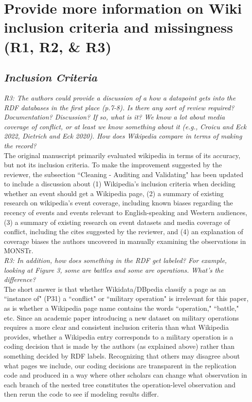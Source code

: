 \documentclass[fleqn,12pt]{article}
\begin{document}
\section{Provide more information on Wiki inclusion criteria and missingness (R1, R2, \& R3)}
\subsection*{\textit{Inclusion Criteria}}
\textit{R3: The authors could provide a discussion of a how a datapoint gets into the RDF databases in the first place (p.7-8). Is there any sort of review required? Documentation? Discussion? If so, what is it? We know a lot about media coverage of conflict, or at least we know something about it (e.g., Croicu and Eck 2022, Dietrich and Eck 2020). How does Wikipedia compare in terms of making the record?} \\

The original manuscript primarily evaluated wikipedia in terms of its accuracy, but not its inclusion criteria. To make the improvement suggested by the reviewer, the subsection ``Cleaning - Auditing and Validating" has been updated to include a discussion about (1) Wikipedia's inclusion criteria when deciding whether an event should get a Wikipedia page, (2) a summary of existing research on wikipedia's event coverage, including known biases regarding the recency of events and events relevant to English-speaking and Western audiences, (3) a summary of existing research on event datasets and media coverage of conflict, including the cites suggested by the reviewer, and (4) an explanation of coverage biases the authors uncovered in manually examining the observations in MONSTr. \\

\textit{R3: In addition, how does something in the RDF get labeled? For example, looking at Figure 3, some are battles and some are operations. What’s the difference?} \\

The short answer is that whether Wikidata/DBpedia classify a page as an ``instance of" (P31) a ``conflict" or ``military operation" is irrelevant for this paper, as is whether a Wikipedia page name contains the words ``operation," ``battle," etc. Since an academic paper introducing a new dataset on military operations requires a more clear and consistent inclusion criteria than what Wikipedia provides, whether a Wikipedia entry corresponds to a military operation is a coding decision that is made by the authors (as explained above) rather than something decided by RDF labels. Recognizing that others may disagree about what pages we include, our coding decisions are transparent in the replication code and produced in a way where other scholars can change what observation in each branch of the nested tree constitutes the operation-level observation and then rerun the code to see if modeling results differ.
\end{document}
